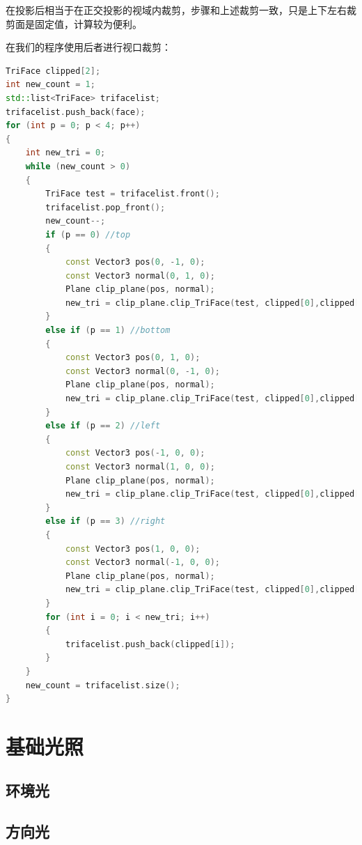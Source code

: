 \documentclass[12pt,oneside,a4paper]{ctexart}
\begin{document}
在投影后相当于在正交投影的视域内裁剪，步骤和上述裁剪一致，只是上下左右裁剪面是固定值，计算较为便利。

在我们的程序使用后者进行视口裁剪：
\newline
\begin{lstlisting}[language=c++]
TriFace clipped[2];
int new_count = 1;
std::list<TriFace> trifacelist;
trifacelist.push_back(face);
for (int p = 0; p < 4; p++)
{
	int new_tri = 0;
	while (new_count > 0)
	{
		TriFace test = trifacelist.front();
		trifacelist.pop_front();
		new_count--;
		if (p == 0) //top
		{
			const Vector3 pos(0, -1, 0);
			const Vector3 normal(0, 1, 0);
			Plane clip_plane(pos, normal);
			new_tri = clip_plane.clip_TriFace(test, clipped[0],clipped[1]);
		}
		else if (p == 1) //bottom
		{
			const Vector3 pos(0, 1, 0);
			const Vector3 normal(0, -1, 0);
			Plane clip_plane(pos, normal);
			new_tri = clip_plane.clip_TriFace(test, clipped[0],clipped[1]);
		}
		else if (p == 2) //left
		{
			const Vector3 pos(-1, 0, 0);
			const Vector3 normal(1, 0, 0);
			Plane clip_plane(pos, normal);
			new_tri = clip_plane.clip_TriFace(test, clipped[0],clipped[1]);
		}
		else if (p == 3) //right
		{
			const Vector3 pos(1, 0, 0);
			const Vector3 normal(-1, 0, 0);
			Plane clip_plane(pos, normal);
			new_tri = clip_plane.clip_TriFace(test, clipped[0],clipped[1]);
		}
		for (int i = 0; i < new_tri; i++)
		{
			trifacelist.push_back(clipped[i]);
		}
	}
	new_count = trifacelist.size();
}
\end{lstlisting}
\section{基础光照}
\subsection{环境光}
\subsection{方向光}
\end{document}
